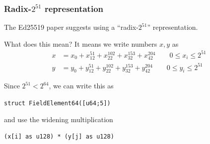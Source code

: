 \documentclass[xetex,aspectratio=169]{beamer}
\begin{document}
  \begin{frame}
    \frametitle{Radix-$2^{51}$ representation}
    
    The Ed25519 paper suggests using a ``radix-$2^{51}$'' representation.

    \pause What does this mean? It means we write numbers $x, y$ as
    \begin{align*}
      x &= x_0 + x_12^{51} + x_22^{102} + x_32^{153} + x_42^{204} \qquad 0 \leq x_i \le 2^{51} \\
      y &= y_0 + y_12^{51} + y_22^{102} + y_32^{153} + y_42^{204} \qquad 0 \leq y_i \le 2^{51} 
    \end{align*}
    
    \pause Since $2^{51} < 2^{64}$, we can write this as 

    \texttt{struct FieldElement64([u64;5])}
    
    and use the widening multiplication 

    \texttt{(x[i] as u128) * (y[j] as u128)}
    
    \end{frame}
\end{document}
